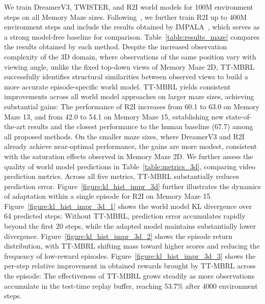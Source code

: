 We train DreamerV3, TWISTER, and R2I world models for 100M environment steps on all Memory Maze sizes. Following~\citet{samsami2024mastering}, we further train R2I up to 400M environment steps and include the results obtained by IMPALA~\citep{espeholt2018impala}, which serves as a strong model-free baseline for comparison. Table~\ref{table:results_maze} compares the results obtained by each method. Despite the increased observation complexity of the 3D domain, where observations of the same position vary with viewing angle, unlike the fixed top-down views of Memory Maze 2D, TT-MBRL successfully identifies structural similarities between observed views to build a more accurate episode-specific world model. TT-MBRL yields consistent improvements across all world model approaches on larger maze sizes, achieving substantial gains: The performance of R2I increases from 60.1 to 63.0 on Memory Maze 13, and from 42.0 to 54.1 on Memory Maze 15, establishing new state-of-the-art results and the closest performance to the human baseline (67.7) among all proposed methods. On the smaller maze sizes, where DreamerV3 and R2I already achieve near-optimal performance, the gains are more modest, consistent with the saturation effects observed in Memory Maze 2D. We further assess the quality of world model predictions in Table~\ref{table:metrics_3d}, comparing video prediction metrics. Across all five metrics, TT-MBRL substantially reduces prediction error. Figure~\ref{figure:kl_hist_impr_3d} further illustrates the dynamics of adaptation within a single episode for R2I on Memory Maze 15. Figure~\ref{figure:kl_hist_impr_3d_1} shows the world model KL divergence over 64 predicted steps: Without TT-MBRL, prediction error accumulates rapidly beyond the first 20 steps, while the adapted model maintains substantially lower divergence. Figure~\ref{figure:kl_hist_impr_3d_2} shows the episode return distribution, with TT-MBRL shifting mass toward higher scores and reducing the frequency of low-reward episodes. Figure~\ref{figure:kl_hist_impr_3d_3} shows the per-step relative improvement in obtained rewards brought by TT-MBRL across the episode: The effectiveness of TT-MBRL grows steadily as more observations accumulate in the test-time replay buffer, reaching 53.7\% after 4000 environment steps.

